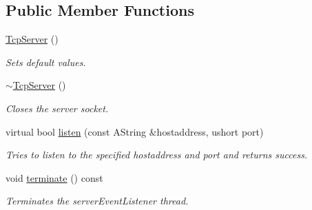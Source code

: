 \subsection*{Public Member Functions}
\begin{DoxyCompactItemize}
\item 
\mbox{\label{class_tcp_server_abc977059ef61f1c42f5fda1bc5945ab0}} 
\mbox{\hyperlink{class_tcp_server_abc977059ef61f1c42f5fda1bc5945ab0}{Tcp\+Server}} ()
\begin{DoxyCompactList}\small\item\em Sets default values. \end{DoxyCompactList}\item 
\mbox{\label{class_tcp_server_a728a9e31c53cf86887f1f6149b1c46dd}} 
\mbox{\hyperlink{class_tcp_server_a728a9e31c53cf86887f1f6149b1c46dd}{$\sim$\+Tcp\+Server}} ()
\begin{DoxyCompactList}\small\item\em Closes the server socket. \end{DoxyCompactList}\item 
virtual bool \mbox{\hyperlink{class_tcp_server_a91c1c56fff64ace30c2622d0d939807e}{listen}} (const A\+String \&hostaddress, ushort port)
\begin{DoxyCompactList}\small\item\em Tries to listen to the specified hostaddress and port and returns success. \end{DoxyCompactList}\item 
\mbox{\label{class_tcp_server_a6f8ced2c4ccd9efe492088d2c35ad7c7}} 
void \mbox{\hyperlink{class_tcp_server_a6f8ced2c4ccd9efe492088d2c35ad7c7}{terminate}} () const
\begin{DoxyCompactList}\small\item\em Terminates the server\+Event\+Listener thread. \end{DoxyCompactList}\end{DoxyCompactItemize}
